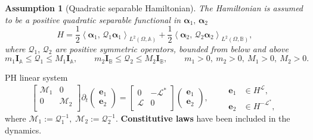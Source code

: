 \documentclass[aspectratio=169]{ISAE-Beamer}
\newcommand{\inner}[3][]{\ensuremath{\left\langle #2, \, #3 \right\rangle_{#1}}}
\newtheorem{assumption}{Assumption}
\begin{document}
\begin{frame}
\begin{assumption}[Quadratic separable Hamiltonian]
	The Hamiltonian is assumed to be a positive quadratic separable functional in $\bm{\alpha}_1, \, \bm{\alpha}_2$ 
	\begin{equation*}
	H = \frac{1}{2} \inner[L^2(\Omega, \mathbb{A})]{\bm{\alpha}_{1}}{\mathcal{Q}_1\bm{\alpha}_{1}} + \frac{1}{2} \inner[L^2(\Omega, \mathbb{B})]{\bm{\alpha}_{2}}{\mathcal{Q}_2\bm{\alpha}_{2}},
	\end{equation*}
	where $\mathcal{Q}_1, \, \mathcal{Q}_2$ are positive symmetric operators, bounded from below and above
	\begin{equation*}
	m_1 \bm{I}_\mathbb{A} \le\mathcal{Q}_1 \le M_1 \bm{I}_\mathbb{A}, \qquad  m_2 \bm{I}_\mathbb{B} \le \mathcal{Q}_2 \le M_2 \bm{I}_\mathbb{B}, \qquad m_1>0, \ m_2>0, \ M_1>0, \ M_2>0.
	\end{equation*} 
\end{assumption}


\begin{exampleblock}{PH linear system}
\begin{equation*}
\begin{bmatrix}
\mathcal{M}_1 & 0 \\
0 & \mathcal{M}_2 \\
\end{bmatrix}
\partial_t \begin{pmatrix}
\bm{e}_1 \\ \bm{e}_2
\end{pmatrix} = \begin{bmatrix}
0 &  - \mathcal{L}^* \\
\mathcal{L} & 0 \\
\end{bmatrix}\begin{pmatrix}
\bm{e}_1 \\ \bm{e}_2
\end{pmatrix} , \qquad \begin{aligned}
\bm{e}_1 &\in H^{\mathcal{L}}, 	\\
\bm{e}_2 &\in H^{-\mathcal{L}^*},
\end{aligned}
\end{equation*}
where $\mathcal{M}_1:=\mathcal{Q}_1^{-1},\; \mathcal{M}_2:=\mathcal{Q}_2^{-1}$. \textbf{Constitutive laws} have been included in the dynamics.
\end{exampleblock}

\end{frame}
\end{document}
